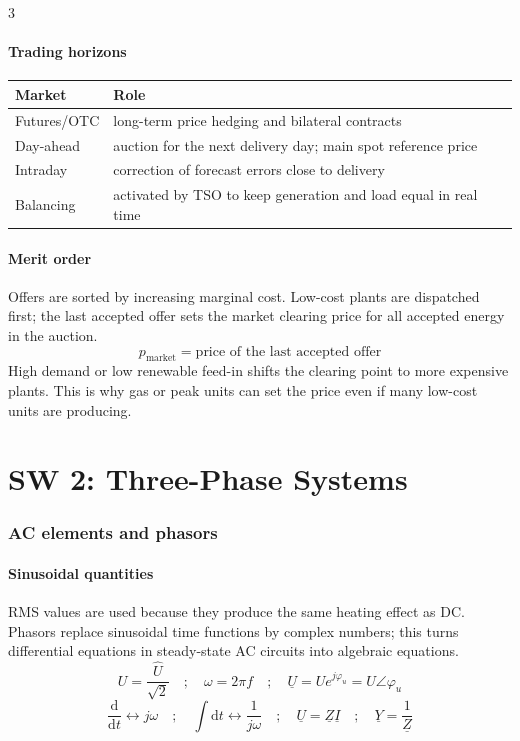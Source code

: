 \documentclass[9pt, landscape, a4paper]{article}
\begin{document}
\begin{multicols*}{3}
\subsection{Trading horizons}
\begin{tabularx}{\columnwidth}{@{}lX@{}}
  \toprule
  \textbf{Market} & \textbf{Role}\\
  \midrule
  Futures/OTC & long-term price hedging and bilateral contracts\\
  Day-ahead & auction for the next delivery day; main spot reference price\\
  Intraday & correction of forecast errors close to delivery\\
  Balancing & activated by TSO to keep generation and load equal in real time\\
  \bottomrule
\end{tabularx}

\subsection{Merit order}
Offers are sorted by increasing marginal cost. Low-cost plants are dispatched
first; the last accepted offer sets the market clearing price for all accepted
energy in the auction.
\[
  p_{\mathrm{market}}=\text{price of the last accepted offer}
\]
High demand or low renewable feed-in shifts the clearing point to more
expensive plants. This is why gas or peak units can set the price even if many
low-cost units are producing.

\part{SW 2: Three-Phase Systems}
\section{AC elements and phasors}
\subsection{Sinusoidal quantities}
RMS values are used because they produce the same heating effect as DC. Phasors
replace sinusoidal time functions by complex numbers; this turns differential
equations in steady-state AC circuits into algebraic equations.
\[
  U=\frac{\hat U}{\sqrt{2}}
  \quad ; \quad
  \omega=2\pi f
  \quad ; \quad
  \underline U=Ue^{j\varphi_u}=U\angle\varphi_u
\]
\[
  \frac{\mathrm d}{\mathrm dt}\longleftrightarrow j\omega
  \quad ; \quad
  \int\mathrm dt\longleftrightarrow\frac{1}{j\omega}
  \quad ; \quad
  \underline U=\underline Z\underline I
  \quad ; \quad
  \underline Y=\frac{1}{\underline Z}
\]

\end{multicols*}
\end{document}
